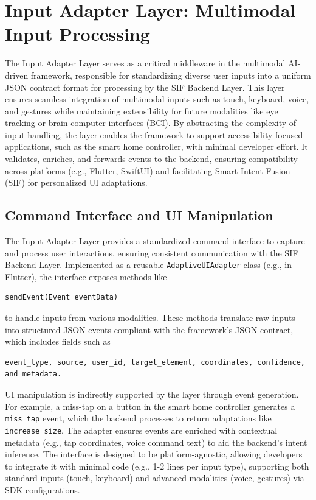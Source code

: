 \documentclass[openany]{book}
\begin{document}
\section{Input Adapter Layer: Multimodal Input Processing}
The Input Adapter Layer serves as a critical middleware in the multimodal AI-driven framework, responsible for standardizing diverse user inputs into a uniform JSON contract format for processing by the SIF Backend Layer. This layer ensures seamless integration of multimodal inputs such as touch, keyboard, voice, and gestures while maintaining extensibility for future modalities like eye tracking or brain-computer interfaces (BCI). By abstracting the complexity of input handling, the layer enables the framework to support accessibility-focused applications, such as the smart home controller, with minimal developer effort. It validates, enriches, and forwards events to the backend, ensuring compatibility across platforms (e.g., Flutter, SwiftUI) and facilitating Smart Intent Fusion (SIF) for personalized UI adaptations.

    \subsection{Command Interface and UI Manipulation}
    The Input Adapter Layer provides a standardized command interface to capture and process user interactions, ensuring consistent communication with the SIF Backend Layer. Implemented as a reusable \verb|AdaptiveUIAdapter| class (e.g., in Flutter), the interface exposes methods like \begin{verbatim}sendEvent(Event eventData)\end{verbatim} 
    to handle inputs from various modalities. These methods translate raw inputs into structured JSON events compliant with the framework’s JSON contract, which includes fields such as \begin{verbatim}event_type, source, user_id, target_element, coordinates, confidence, and metadata.\end{verbatim}
    
    UI manipulation is indirectly supported by the layer through event generation. For example, a miss-tap on a button in the smart home controller generates a \verb|miss_tap| event, which the backend processes to return adaptations like \verb|increase_size|. The adapter ensures events are enriched with contextual metadata (e.g., tap coordinates, voice command text) to aid the backend’s intent inference. The interface is designed to be platform-agnostic, allowing developers to integrate it with minimal code (e.g., 1-2 lines per input type), supporting both standard inputs (touch, keyboard) and advanced modalities (voice, gestures) via SDK configurations.
    
\end{document}
